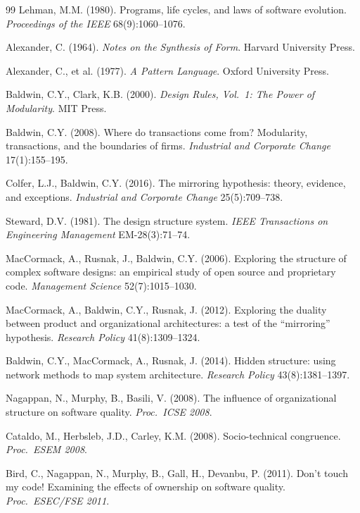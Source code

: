 \documentclass[11pt,oneside]{article}
\theoremstyle{definition}
\begin{document}
\begin{thebibliography}{99}
 Lehman, M.M. (1980). Programs, life cycles, and laws of software evolution.
\emph{Proceedings of the IEEE} 68(9):1060--1076.

 Alexander, C. (1964). \emph{Notes on the Synthesis of Form}. Harvard
University Press.

 Alexander, C., et al. (1977). \emph{A Pattern Language}. Oxford
University Press.

 Baldwin, C.Y., Clark, K.B. (2000). \emph{Design Rules, Vol.~1: The
Power of Modularity}. MIT Press.

 Baldwin, C.Y. (2008). Where do transactions come from? Modularity,
transactions, and the boundaries of firms. \emph{Industrial and Corporate Change} 17(1):155--195.

 Colfer, L.J., Baldwin, C.Y. (2016). The mirroring hypothesis: theory,
evidence, and exceptions. \emph{Industrial and Corporate Change} 25(5):709--738.

 Steward, D.V. (1981). The design structure system. \emph{IEEE Transactions
on Engineering Management} EM-28(3):71--74.

 MacCormack, A., Rusnak, J., Baldwin, C.Y. (2006). Exploring the
structure of complex software designs: an empirical study of open source and proprietary code.
\emph{Management Science} 52(7):1015--1030.

 MacCormack, A., Baldwin, C.Y., Rusnak, J. (2012). Exploring the duality
between product and organizational architectures: a test of the ``mirroring'' hypothesis.
\emph{Research Policy} 41(8):1309--1324.

 Baldwin, C.Y., MacCormack, A., Rusnak, J. (2014). Hidden structure: using
network methods to map system architecture. \emph{Research Policy} 43(8):1381--1397.

 Nagappan, N., Murphy, B., Basili, V. (2008). The influence of
organizational structure on software quality. \emph{Proc.\ ICSE 2008}.

 Cataldo, M., Herbsleb, J.D., Carley, K.M. (2008). Socio-technical
congruence. \emph{Proc.\ ESEM 2008}.

 Bird, C., Nagappan, N., Murphy, B., Gall, H., Devanbu, P. (2011). Don't touch
my code! Examining the effects of ownership on software quality. \emph{Proc.\ ESEC/FSE 2011}.


\end{thebibliography}
\end{document}
